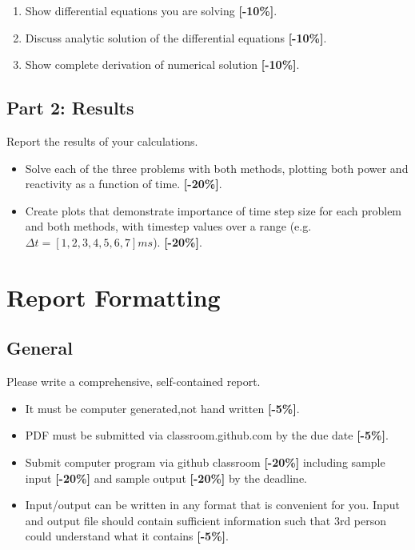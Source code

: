 \documentclass{article}
\begin{document}
\begin{enumerate}
        \item Show differential equations you are solving  {\color{red}\textbf{[-10\%]}}.
        \item Discuss analytic solution of the differential equations  {\color{red}\textbf{[-10\%]}}.
        \item Show complete derivation of numerical solution {\color{red}\textbf{[-10\%]}}.
\end{enumerate}

\subsection{Part 2: Results}

Report the results of your calculations.

\begin{itemize}
        \item Solve each of the three problems with both methods, 
                plotting both power and reactivity as a function of time.  
                {\color{red}\textbf{[-20\%]}}.
        \item Create plots that demonstrate importance of time step size for 
                each problem and both methods, with timestep values over a 
                range (e.g. $\Delta t = [1,2,3,4,5,6,7] ms$).
                {\color{red}\textbf{[-20\%]}}.
\end{itemize}

\section{Report Formatting}
\subsection{General}
Please write a comprehensive, self-contained report.
                \begin{itemize}
                        \item It must be computer generated,not hand written 
                                {\color{red}\textbf{[-5\%]}}.
                        \item PDF must be submitted via classroom.github.com by 
                                the due date  {\color{red}\textbf{[-5\%]}}.
                        \item Submit computer program via github classroom 
                                 {\color{red}\textbf{[-20\%]}} including sample input  {\color{red}\textbf{[-20\%]}} 
                                and sample output  {\color{red}\textbf{[-20\%]}} by the deadline.
                        \item    Input/output can be written in any format that is convenient 
                                for you.  Input and output file should contain sufficient 
                                information such that 3rd person could understand what it 
                                contains  {\color{red}\textbf{[-5\%]}}.
                \end{itemize}
\end{document}
